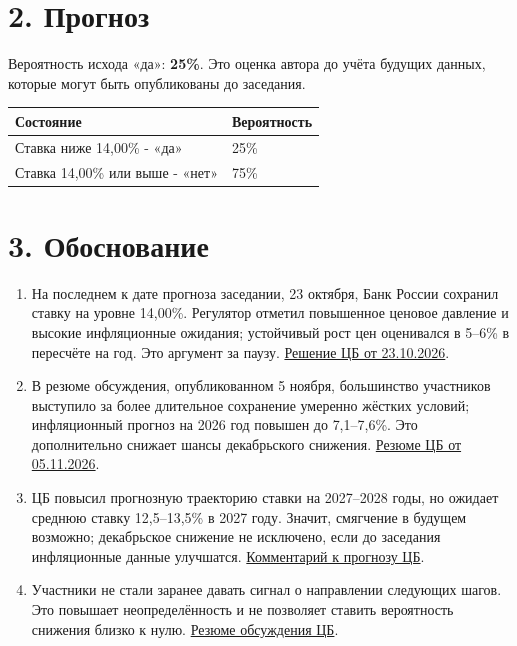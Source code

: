 \documentclass[10pt,a4paper]{article}
\newcommand{\source}[2]{\href{#1}{#2}}
\begin{document}
\section*{2. Прогноз}
Вероятность исхода «да»: \textbf{25\%}. Это оценка автора до учёта будущих данных, которые могут быть опубликованы до заседания.

\begin{tabular}{|p{10.5cm}|p{5.8cm}|}\hline
Состояние & Вероятность \\ \hline
Ставка ниже 14,00\% - «да» & 25\% \\ \hline
Ставка 14,00\% или выше - «нет» & 75\% \\ \hline
\end{tabular}

\section*{3. Обоснование}
\begin{enumerate}
\setlength{\itemsep}{1pt}
\item На последнем к дате прогноза заседании, 23 октября, Банк России сохранил ставку на уровне 14,00\%. Регулятор отметил повышенное ценовое давление и высокие инфляционные ожидания; устойчивый рост цен оценивался в 5--6\% в пересчёте на год. Это аргумент за паузу. \source{https://www.cbr.ru/press/keypr/}{Решение ЦБ от 23.10.2026}.
\item В резюме обсуждения, опубликованном 5 ноября, большинство участников выступило за более длительное сохранение умеренно жёстких условий; инфляционный прогноз на 2026 год повышен до 7,1--7,6\%. Это дополнительно снижает шансы декабрьского снижения. \source{https://www.cbr.ru/dkp/mp_dec/decision_key_rate/summary_key_rate_05112026/}{Резюме ЦБ от 05.11.2026}.
\item ЦБ повысил прогнозную траекторию ставки на 2027--2028 годы, но ожидает среднюю ставку 12,5--13,5\% в 2027 году. Значит, смягчение в будущем возможно; декабрьское снижение не исключено, если до заседания инфляционные данные улучшатся. \source{https://www.cbr.ru/dkp/mp_dec/decision_key_rate/comment_05112026/}{Комментарий к прогнозу ЦБ}.
\item Участники не стали заранее давать сигнал о направлении следующих шагов. Это повышает неопределённость и не позволяет ставить вероятность снижения близко к нулю. \source{https://www.cbr.ru/dkp/mp_dec/decision_key_rate/summary_key_rate_05112026/}{Резюме обсуждения ЦБ}.
\end{enumerate}
\end{document}
